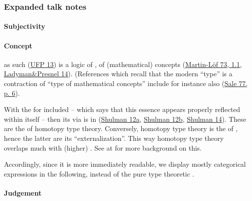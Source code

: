 \documentclass[12pt,titlepage]{article}
\theoremstyle{plain}
\theoremstyle{definition}
\theoremstyle{remark}
\begin{document}
\hypertarget{expanded_talk_notes}{}\subsubsection*{{Expanded talk notes}}\label{expanded_talk_notes}

\hypertarget{FormalizationConcepts}{}\paragraph*{{Subjectivity}}\label{FormalizationConcepts}

\hypertarget{ConceptFormalization}{}\paragraph*{{Concept}}\label{ConceptFormalization}

 as such (\hyperlink{UFP13}{UFP 13}) is a logic of , of (mathematical) concepts (\hyperlink{MartinLoef73}{Martin-Löf 73, 1.1}, \hyperlink{LadymanPresnel14}{Ladyman\&Presnel 14}). (References which recall that the modern ``type'' is a contraction of ``type of mathematical concepts'' include for instance also (\hyperlink{Sale77}{Sale 77, p. 6}).

With the  for   included -- which says that this essence appears properly reflected within itself -- then its  via  is in   (\hyperlink{Shulman12a}{Shulman 12a}, \hyperlink{Shulman12b}{Shulman 12b}, \hyperlink{Shulman14}{Shulman 14}). These are the  of homotopy type theory. Conversely, homotopy type theory is the  of , hence the latter are its ``externalization''. This way homotopy type theory overlaps much with (higher) . See at  for more background on this.

Accordingly, since it is more immediately readable, we display mostly categorical expressions in the following, instead of the pure type theoretic .

\hypertarget{JudgementInFormalization}{}\paragraph*{{Judgement}}\label{JudgementInFormalization}
\end{document}
